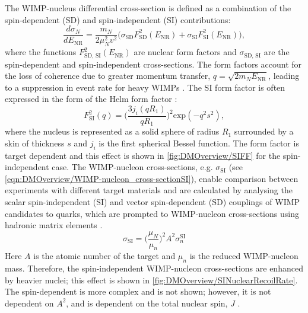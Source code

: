 The WIMP-nucleus differential cross-section is defined as a combination of the spin-dependent (SD) and spin-independent (SI) contributions:
\begin{equation}
    \frac{d\sigma_N}{dE_\text{NR}}=\frac{m_N}{2\mu^2_Nv^2}\biggl(\sigma_\text{SD}F_\text{SD}^2(E_\text{NR})+\sigma_\text{SI}F_\text{SI}^2(E_\text{NR})\biggl),
\end{equation}
where the functions $F_\text{SD, SI}^2(E_\text{NR})$ are nuclear form factors and $\sigma_\text{SD, SI}$ are the spin-dependent and spin-independent cross-sections. The form factors account for the loss of coherence due to greater momentum transfer, $q=\sqrt{2m_NE_\text{NR}}$, leading to a suppression in event rate for heavy WIMPs \cite{Cerdeno:2010jj}. The SI form factor is often expressed in the form of the Helm form factor \cite{edfraser:thesis}:
\begin{equation}
    F_\text{SI}^2(q)=\biggl(\frac{3j_i(qR_1)}{qR_1}\biggl)^2\text{exp}(-q^2s^2),
\end{equation}
where the nucleus is represented as a solid sphere of radius $R_1$ surrounded by a skin of thickness $s$ and $j_i$ is the first spherical Bessel function. The form factor is target dependent and this effect is shown in \autoref{fig:DMOverview/SIFF} for the spin-independent case.
The WIMP-nucleon cross-sections, e.g. $\sigma_\text{SI}$ (see \autoref{eqn:DMOverview/WIMP-nucleon_cross-sectionSI}), enable comparison between experiments with different target materials and are calculated by analysing the scalar spin-independent (SI) and vector spin-dependent (SD) couplings of WIMP candidates to quarks, which are prompted to WIMP-nucleon cross-sections using hadronic matrix elements \cite{edfraser:thesis}.
\begin{equation}\label{eqn:DMOverview/WIMP-nucleon_cross-sectionSI}
    \sigma_\text{SI}=\biggl(\frac{\mu_N}{\mu_n}\biggl)^2A^2\sigma^\text{SI}_n
\end{equation}
Here $A$ is the atomic number of the target and $\mu_n$ is the reduced WIMP-nucleon mass. Therefore, the spin-independent WIMP-nucleon cross-sections are enhanced by heavier nuclei; this effect is shown in \autoref{fig:DMOverview/SINuclearRecoilRate}. The spin-dependent is more complex and is not shown; however, it is not dependent on $A^2$, and is dependent on the total nuclear spin, $J$ \cite{OlcinaSamblas:thesis}.

